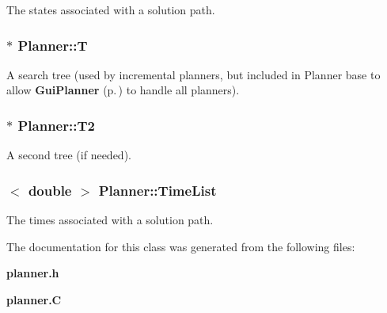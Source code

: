 The states associated with a solution path.

\subsubsection{ $\ast$ Planner::T}\label{classPlanner_m7}


A search tree (used by incremental planners, but included in Planner base to allow {\bf Gui\-Planner} {\rm (p.\,\pageref{classGuiPlanner})} to handle all planners).

\subsubsection{ $\ast$ Planner::T2}\label{classPlanner_m8}


A second tree (if needed).

\subsubsection{$<$ double $>$ Planner::Time\-List}\label{classPlanner_m10}


The times associated with a solution path.



The documentation for this class was generated from the following files:\begin{CompactItemize}
\item 
{\bf planner.h}\item 
{\bf planner.C}\end{CompactItemize}
